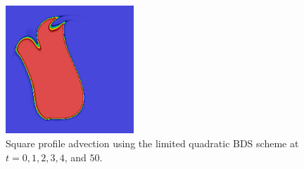 \documentclass[final]{siamltex}
\begin{document}
\begin{figure}
\begin{center}
\includegraphics[width=1.9in]{square_movie6}
\caption{Square profile advection using the limited quadratic BDS scheme 
at $t=0,1,2,3,4$, and $50$.}
\label{fig:square2}
\end{center}
\end{figure}

\end{document}
